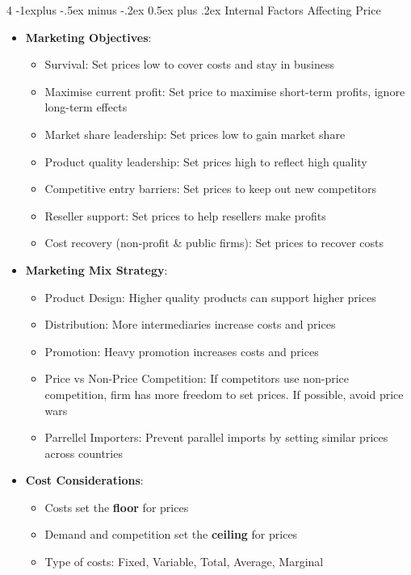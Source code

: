 \documentclass[10pt, landscape]{article}
\makeatletter
\renewcommand{\subsection}{\@startsection{subsection}{2}{0mm}%
  {-1explus -.5ex minus -.2ex}%
  {0.5ex plus .2ex}%
{\normalfont\normalsize\bfseries}}
\makeatother
\begin{document}
\begin{multicols*}{4}
  \subsection{Internal Factors Affecting Price}
  \begin{itemize}
    \item \textbf{Marketing Objectives}:
    \begin{itemize}
      \item Survival: Set prices low to cover costs and stay in business
      \item Maximise current profit: Set price to maximise short-term profits, ignore long-term effects
      \item Market share leadership: Set prices low to gain market share
      \item Product quality leadership: Set prices high to reflect high quality
      \item Competitive entry barriers: Set prices to keep out new competitors
      \item Reseller support: Set prices to help resellers make profits
      \item Cost recovery (non-profit \& public firms): Set prices to recover costs
    \end{itemize}
    \item \textbf{Marketing Mix Strategy}:
    \begin{itemize}
      \item Product Design: Higher quality products can support higher prices
      \item Distribution: More intermediaries increase costs and prices
      \item Promotion: Heavy promotion increases costs and prices
      \item Price vs Non-Price Competition: If competitors use non-price competition, firm has more freedom to set prices. If possible, avoid price wars
      \item Parrellel Importers: Prevent parallel imports by setting similar prices across countries
    \end{itemize}
    \item \textbf{Cost Considerations}:
    \begin{itemize}
      \item Costs set the \textbf{floor} for prices
      \item Demand and competition set the \textbf{ceiling} for prices
      \item Type of costs: Fixed, Variable, Total, Average, Marginal

\end{itemize}
\end{itemize}
\end{multicols*}
\end{document}
